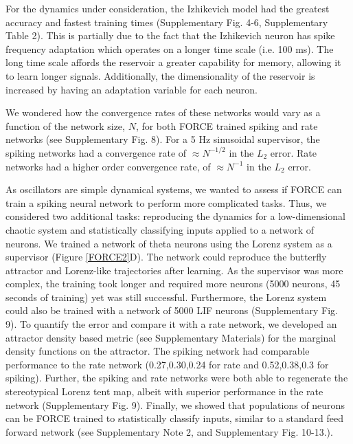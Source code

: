 \documentclass[11pt]{article} %
\begin{document}
For the dynamics under consideration, the Izhikevich model had the greatest accuracy and fastest training times (Supplementary Fig. 4-6, Supplementary Table 2).  This is partially due to the fact that the Izhikevich neuron has spike frequency adaptation which operates on a longer time scale (i.e. 100 ms).  The long time scale affords the reservoir a greater capability for memory, allowing it to learn longer signals.    Additionally, the dimensionality of the reservoir is increased by having an adaptation variable for each neuron.

We wondered how the convergence rates of these networks would vary as a function of the network size, $N$, for both FORCE trained spiking and rate networks  (see Supplementary Fig. 8).  For a 5 Hz sinusoidal supervisor, the spiking networks had a convergence rate of $\approx {N}^{-1/2}$ in the $L_2$ error.  Rate networks had a higher order convergence rate, of $\approx N^{-1}$ in the $L_2$ error.  



As oscillators are simple dynamical systems, we wanted to assess if FORCE can train a spiking neural network to perform more complicated tasks.   Thus, we considered two additional tasks: reproducing the dynamics for a low-dimensional chaotic system and statistically classifying inputs applied to a network of neurons.  We trained a network of theta neurons using the Lorenz system as a supervisor (Figure \ref{FORCE2}D).    The network could reproduce the butterfly attractor and Lorenz-like trajectories after learning.  As the supervisor was more complex, the training took longer and required more neurons (5000 neurons, 45 seconds of training) yet was still successful.  Furthermore, the Lorenz system could also be trained with a network of 5000 LIF neurons (Supplementary Fig. 9).     To quantify the error and compare it with a rate network, we developed an attractor density based metric (see Supplementary Materials) for the marginal density functions on the attractor.  The spiking network had comparable performance to the rate network (0.27,0.30,0.24 for rate and 0.52,0.38,0.3 for spiking). Further, the spiking and rate networks were both able to regenerate the stereotypical Lorenz tent map, albeit with superior performance in the rate network (Supplementary Fig. 9).    Finally, we showed that populations of neurons can be FORCE trained to statistically classify inputs, similar to a standard feed forward network (see Supplementary Note 2, and Supplementary Fig. 10-13.).  
\end{document}
